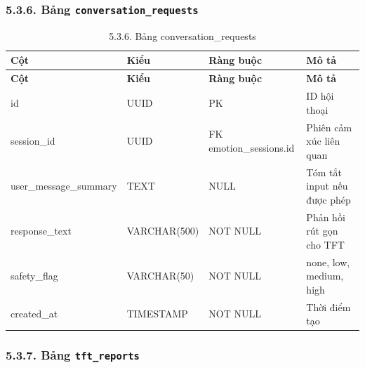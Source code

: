 \documentclass[12pt,a4paper]{article}
\begin{document}
\subsubsection*{5.3.6. Bảng \texttt{conversation\_requests}}

\begin{center}
\scriptsize
\begin{longtable}{|P{0.18\textwidth}|P{0.25\textwidth}|P{0.25\textwidth}|P{0.22\textwidth}|}
\caption{5.3.6. Bảng conversation\_requests}\\
\hline
\textbf{Cột} & \textbf{Kiểu} & \textbf{Ràng buộc} & \textbf{Mô tả} \\
\hline
\endfirsthead
\hline
\textbf{Cột} & \textbf{Kiểu} & \textbf{Ràng buộc} & \textbf{Mô tả} \\
\hline
\endhead
id & UUID & PK & ID hội thoại \\
\hline
session\_id & UUID & FK emotion\_sessions.id & Phiên cảm xúc liên quan \\
\hline
user\_message\_summary & TEXT & NULL & Tóm tắt input nếu được phép \\
\hline
response\_text & VARCHAR(500) & NOT NULL & Phản hồi rút gọn cho TFT \\
\hline
safety\_flag & VARCHAR(50) & NOT NULL & none, low, medium, high \\
\hline
created\_at & TIMESTAMP & NOT NULL & Thời điểm tạo \\
\hline
\end{longtable}
\normalsize
\end{center}

\subsubsection*{5.3.7. Bảng \texttt{tft\_reports}}
\end{document}
